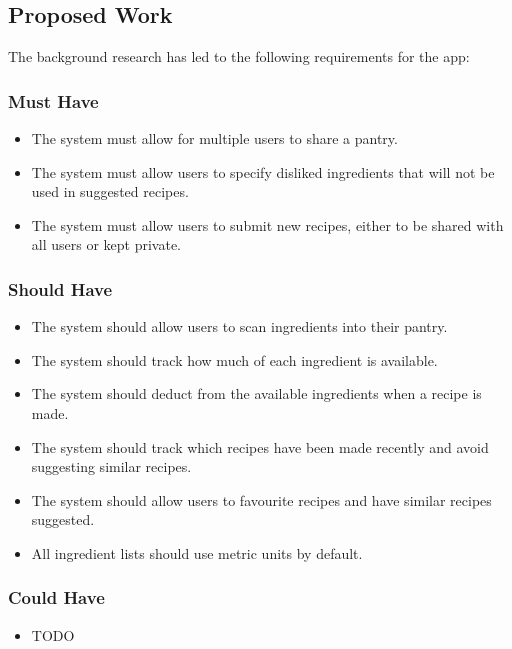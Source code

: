 \documentclass[../CHEFCookingHelperForEveryonesFridge.tex]{subfiles}
\begin{document}
\subsection{Proposed Work}
The background research has led to the following requirements for the \chef{} app:
\subsubsection{Must Have}
\begin{itemize}
    \item The system must allow for multiple users to share a pantry.
    \item The system must allow users to specify disliked ingredients that will not be used in suggested recipes.
    \item The system must allow users to submit new recipes, either to be shared with all users or kept private.
\end{itemize}

\subsubsection{Should Have}
\begin{itemize}
    \item The system should allow users to scan ingredients into their pantry.
    \item The system should track how much of each ingredient is available.
    \item The system should deduct from the available ingredients when a recipe is made.
    \item The system should track which recipes have been made recently and avoid suggesting similar recipes.
    \item The system should allow users to favourite recipes and have similar recipes suggested.
    \item All ingredient lists should use metric units by default.
\end{itemize}

\subsubsection{Could Have}
\begin{itemize}
    \item TODO
\end{itemize}
\end{document}
